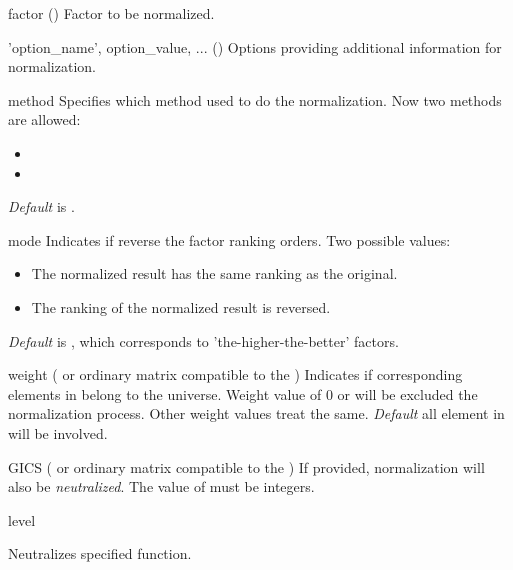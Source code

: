 \inarg
   \begin{argdesc}
      \item[factor]  (\myfints{}) Factor to be normalized.
      \item['option\_name', option\_value, ...] (\myfints{}) Options providing additional information for normalization.
         \begin{argdesc}
            \item[method] Specifies which method used to do the normalization. 
                 Now two methods are allowed:
                 \begin{itemize}
                    \item {}
                    \item {}
                 \end{itemize}
                 \emph{Default} is .
            \item[mode] Indicates if reverse the factor ranking orders. Two possible values:
                  \begin{itemize}
                    \item {} The normalized result has the same ranking as the original.
                    \item {} The ranking of the normalized result is reversed.
                  \end{itemize}
                  \emph{Default} is , which corresponds to 'the-higher-the-better' factors.
            \item[weight] (\myfints{} or ordinary matrix compatible to the ) 
                  Indicates if corresponding elements in  belong to the universe.
                  Weight value of 0 or  will be excluded the normalization process.
                  Other weight values treat the same.
                  \emph{Default} all element in  will be involved.
            \item[GICS]  (\myfints{} or ordinary matrix compatible to the )
                  If provided, normalization will also be \emph{neutralized}.
                  The value of  must be integers.
            \item[level] 
         \end{argdesc}
   \end{argdesc}

  Neutralizes specified function.

